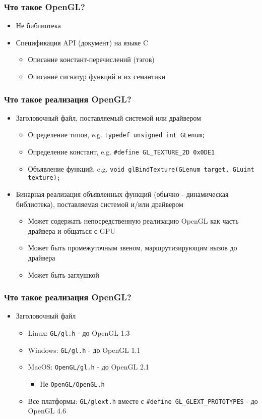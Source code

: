 \documentclass{beamer}
\begin{document}
\begin{frame}
\frametitle{Что такое OpenGL?}
\begin{itemize}
\item {\color{red}Не} библиотека
\item Спецификация API (документ) на языке C
\begin{itemize}
\item Описание констант-перечислений (тэгов)
\item Описание сигнатур функций и их семантики
\end{itemize}
\end{itemize}
\end{frame}

\begin{frame}[fragile]
\frametitle{Что такое реализация OpenGL?}
\begin{itemize}
\item Заголовочный файл, поставляемый системой или драйвером
\begin{itemize}
\item Определение типов, e.g. \verb|typedef unsigned int GLenum;|
\item Определение констант, e.g. \verb|#define GL_TEXTURE_2D 0x0DE1|
\item Объявление функций, e.g. \verb|void glBindTexture(GLenum target, GLuint texture);|
\end{itemize}
\pause
\item Бинарная реализация объявленных функций (обычно - динамическая библиотека), поставляемая системой и/или драйвером
\begin{itemize}
\item Может содержать непосредственную реализацию OpenGL как часть драйвера и общаться с GPU
\item Может быть промежуточным звеном, маршрутизирующим вызов до драйвера
\item Может быть заглушкой
\end{itemize}
\end{itemize}
\end{frame}

\begin{frame}[fragile]
\frametitle{Что такое реализация OpenGL?}
\begin{itemize}
\item Заголовочный файл
\begin{itemize}
\item Linux: \verb|GL/gl.h| - до OpenGL 1.3
\pause
\item Windows: \verb|GL/gl.h| - до OpenGL 1.1
\pause
\item MacOS: \verb|OpenGL/gl.h| - до OpenGL 2.1
\begin{itemize}
\item {\color{red}Не} \verb|OpenGL/OpenGL.h|
\end{itemize}
\item Все платформы: \verb|GL/glext.h| вместе с \verb|#define GL_GLEXT_PROTOTYPES| - до OpenGL 4.6
\end{itemize}
\end{itemize}
\end{frame}
\end{document}
